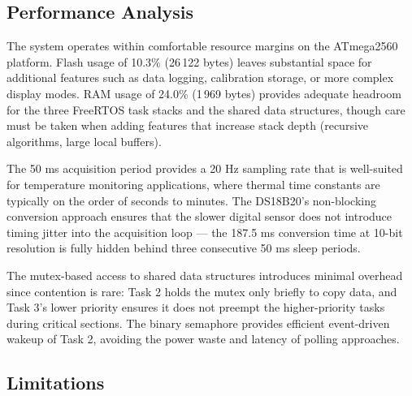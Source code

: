 \subsection{Performance Analysis}

The system operates within comfortable resource margins on the ATmega2560 platform. Flash usage of 10.3\% (26\,122 bytes) leaves substantial space for additional features such as data logging, calibration storage, or more complex display modes. RAM usage of 24.0\% (1\,969 bytes) provides adequate headroom for the three FreeRTOS task stacks and the shared data structures, though care must be taken when adding features that increase stack depth (recursive algorithms, large local buffers).

The 50 ms acquisition period provides a 20 Hz sampling rate that is well-suited for temperature monitoring applications, where thermal time constants are typically on the order of seconds to minutes. The DS18B20's non-blocking conversion approach ensures that the slower digital sensor does not introduce timing jitter into the acquisition loop --- the 187.5 ms conversion time at 10-bit resolution is fully hidden behind three consecutive 50 ms sleep periods.

The mutex-based access to shared data structures introduces minimal overhead since contention is rare: Task 2 holds the mutex only briefly to copy data, and Task 3's lower priority ensures it does not preempt the higher-priority tasks during critical sections. The binary semaphore provides efficient event-driven wakeup of Task 2, avoiding the power waste and latency of polling approaches.

\subsection{Limitations}

